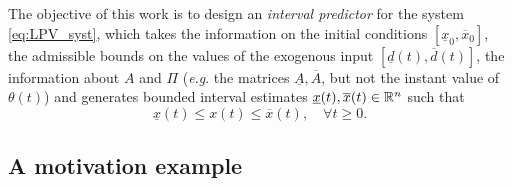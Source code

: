\documentclass[letterpaper, 10 pt, conference]{ieeeconf}
\theoremstyle{plain}
\theoremstyle{definition}
\theoremstyle{plain}
\theoremstyle{plain}
\theoremstyle{remark}
\begin{document}
The objective of this work is to design an \emph{interval predictor} for the system \eqref{eq:LPV_syst}, which takes the information on the initial conditions $[\underline{x}_{0},\overline{x}_{0}]$, the admissible bounds on the values of the exogenous input $[\underline{d}(t),\overline{d}(t)]$, the information about $A$ and $\Pi$ (\emph{e.g}. the matrices $\underline{A},\overline{A}$, but not the instant value of $\theta(t)$) and generates bounded interval estimates $\underline{x}(t),\overline{x}(t)\in\mathbb{R}^{n}$ such that
\begin{equation}
\underline{x}(t)\leq x(t)\leq\overline{x}(t),\quad\forall t\geq0.\label{eq:Interval_Goal}
\end{equation}

\subsection{A motivation example}
\end{document}
